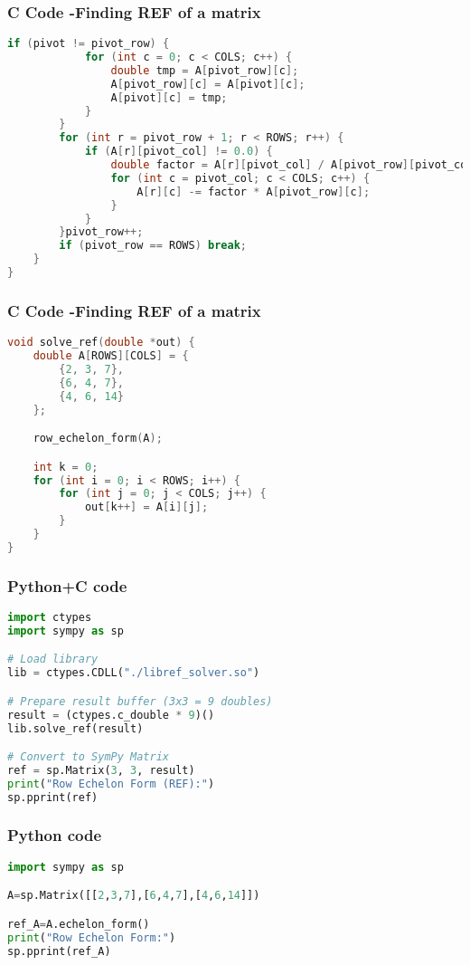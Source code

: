 \documentclass{beamer}
\begin{document}
\begin{frame}[fragile]
    \frametitle{C Code -Finding REF of a matrix}

    \begin{lstlisting}[language=C]
        if (pivot != pivot_row) {
            for (int c = 0; c < COLS; c++) {
                double tmp = A[pivot_row][c];
                A[pivot_row][c] = A[pivot][c];
                A[pivot][c] = tmp;
            }
        }
        for (int r = pivot_row + 1; r < ROWS; r++) {
            if (A[r][pivot_col] != 0.0) {
                double factor = A[r][pivot_col] / A[pivot_row][pivot_col];
                for (int c = pivot_col; c < COLS; c++) {
                    A[r][c] -= factor * A[pivot_row][c];
                }
            }
        }pivot_row++;
        if (pivot_row == ROWS) break;
    }
}

    \end{lstlisting}
\end{frame}

\begin{frame}[fragile]
    \frametitle{C Code -Finding REF of a matrix}

    \begin{lstlisting}[language=C]
void solve_ref(double *out) {
    double A[ROWS][COLS] = {
        {2, 3, 7},
        {6, 4, 7},
        {4, 6, 14}
    };

    row_echelon_form(A);

    int k = 0;
    for (int i = 0; i < ROWS; i++) {
        for (int j = 0; j < COLS; j++) {
            out[k++] = A[i][j];
        }
    }
}
    \end{lstlisting}
\end{frame}



\begin{frame}[fragile]
    \frametitle{Python+C code}

    \begin{lstlisting}[language=Python]
import ctypes
import sympy as sp

# Load library
lib = ctypes.CDLL("./libref_solver.so")

# Prepare result buffer (3x3 = 9 doubles)
result = (ctypes.c_double * 9)()
lib.solve_ref(result)

# Convert to SymPy Matrix
ref = sp.Matrix(3, 3, result)
print("Row Echelon Form (REF):")
sp.pprint(ref)
    \end{lstlisting}
\end{frame}

\begin{frame}[fragile]
    \frametitle{Python code}
    \begin{lstlisting}[language=Python]
import sympy as sp

A=sp.Matrix([[2,3,7],[6,4,7],[4,6,14]])

ref_A=A.echelon_form()
print("Row Echelon Form:")
sp.pprint(ref_A)
    \end{lstlisting}   
\end{frame}
\end{document}
